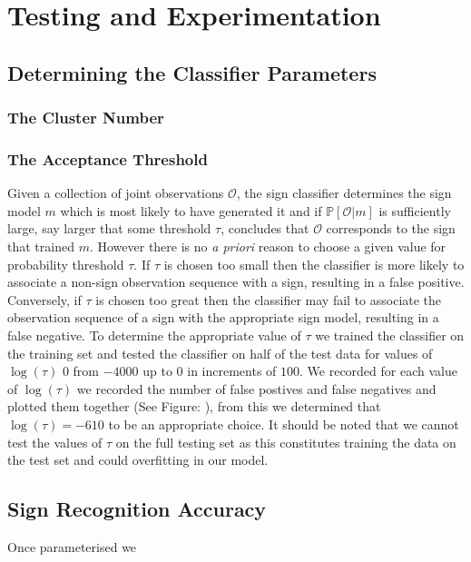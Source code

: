 \chapter{Testing and Experimentation}
\ifpdf
    \graphicspath{{Chapter3/Chapter3Figs/PNG/}{Chapter3/Chapter3Figs/PDF/}{Chapter3/Chapter3Figs/}}
\else
    \graphicspath{{Chapter3/Chapter3Figs/EPS/}{Chapter3/Chapter3Figs/}}
\fi

\section{Determining the Classifier Parameters}

\subsection{The Cluster Number}

\subsection{The Acceptance Threshold}
Given a collection of joint observations $\mathcal{O}$, the sign classifier determines the sign model $m$ which is most likely to have generated it and if $\mathbb{P}[\mathcal{O}|m]$ is sufficiently large, say larger that some threshold $\tau$, concludes that $\mathcal{O}$ corresponds to the sign that trained $m$. However there is no \emph{a priori} reason to choose a given value for probability threshold $\tau$. If $\tau$ is chosen too small then the classifier is more likely to associate a non-sign observation sequence with a sign, resulting in a false positive. Conversely, if $\tau$ is chosen too great then the classifier may fail to associate the observation sequence of a sign with the appropriate sign model, resulting in a false negative. To determine the appropriate value of $\tau$ we trained the classifier on the training set and tested the classifier on half of the test data for values of $\log(\tau)$ 0 from $-4000$ up to $0$ in increments of $100$. We recorded for each value of $\log(\tau)$ we recorded the number of false postives and false negatives and plotted them together (See Figure: ), from this we determined that $\log(\tau) = -610$ to be an appropriate choice. It should be noted that we cannot test the values of $\tau$ on the full testing set as this constitutes training the data on the test set and could overfitting in our model.

\section{Sign Recognition Accuracy}
Once parameterised we 


